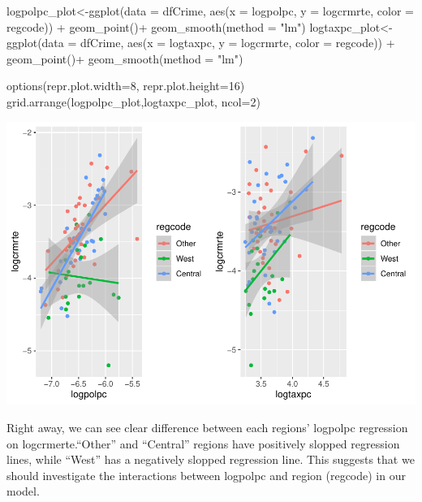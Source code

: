 \documentclass[]{article}
\newenvironment{Shaded}{}{}
\newcommand{\DataTypeTok}[1]{#1}
\newcommand{\DecValTok}[1]{#1}
\newcommand{\KeywordTok}[1]{\textcolor[rgb]{0.00,0.00,1.00}{#1}}
\newcommand{\NormalTok}[1]{#1}
\newcommand{\OperatorTok}[1]{#1}
\newcommand{\StringTok}[1]{\textcolor[rgb]{0.00,0.50,0.50}{#1}}
\begin{document}
\begin{Shaded}
\begin{Highlighting}[]
\NormalTok{logpolpc_plot<-}\KeywordTok{ggplot}\NormalTok{(}\DataTypeTok{data =}\NormalTok{ dfCrime, }\KeywordTok{aes}\NormalTok{(}\DataTypeTok{x =}\NormalTok{ logpolpc, }\DataTypeTok{y =}\NormalTok{ logcrmrte, }\DataTypeTok{color =}\NormalTok{ regcode)) }\OperatorTok{+}\StringTok{ }
\StringTok{      }\KeywordTok{geom_point}\NormalTok{()}\OperatorTok{+}
\StringTok{  }\KeywordTok{geom_smooth}\NormalTok{(}\DataTypeTok{method =} \StringTok{"lm"}\NormalTok{)}
\NormalTok{logtaxpc_plot<-}\KeywordTok{ggplot}\NormalTok{(}\DataTypeTok{data =}\NormalTok{ dfCrime, }\KeywordTok{aes}\NormalTok{(}\DataTypeTok{x =}\NormalTok{ logtaxpc, }\DataTypeTok{y =}\NormalTok{ logcrmrte, }\DataTypeTok{color =}\NormalTok{ regcode)) }\OperatorTok{+}\StringTok{ }
\StringTok{      }\KeywordTok{geom_point}\NormalTok{()}\OperatorTok{+}
\StringTok{  }\KeywordTok{geom_smooth}\NormalTok{(}\DataTypeTok{method =} \StringTok{"lm"}\NormalTok{)}

\KeywordTok{options}\NormalTok{(}\DataTypeTok{repr.plot.width=}\DecValTok{8}\NormalTok{, }\DataTypeTok{repr.plot.height=}\DecValTok{16}\NormalTok{)}
\KeywordTok{grid.arrange}\NormalTok{(logpolpc_plot,logtaxpc_plot, }\DataTypeTok{ncol=}\DecValTok{2}\NormalTok{)}
\end{Highlighting}
\end{Shaded}

\includegraphics{Bagnard_Gaustad_Hartman_Leung_Lab_3_files/figure-latex/unnamed-chunk-70-1.pdf}

Right away, we can see clear difference between each regions' logpolpc
regression on logcrmerte.``Other'' and ``Central'' regions have
positively slopped regression lines, while ``West'' has a negatively
slopped regression line. This suggests that we should investigate the
interactions between logpolpc and region (regcode) in our model.
\end{document}
